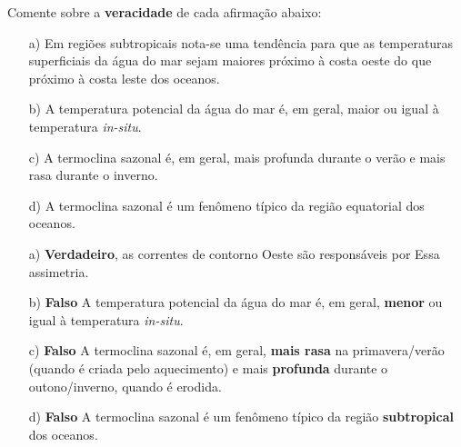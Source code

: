 \documentclass[letterpaper,portuguese,12pt,pdftex]{exam}
\begin{document}
\begin{questions}


  \question[4]
  Comente sobre a {\bf veracidade} de cada afirmação abaixo:
  \begin{itemize}
    \item[a)] Em regiões subtropicais nota-se uma tendência para que as
              temperaturas superficiais da água do mar sejam maiores próximo à
              costa oeste do que próximo à costa leste dos oceanos.
    \item[b)] A temperatura potencial da água do mar é, em geral, maior ou igual
              à temperatura {\it in-situ}.
    \item[c)] A termoclina sazonal é, em geral, mais profunda durante o verão e
              mais rasa durante o inverno.
    \item[d)] A termoclina sazonal é um fenômeno típico da região equatorial dos
              oceanos.
  \end{itemize}

  \begin{solution}
    \begin{itemize}
      \item[a)] {\bf Verdadeiro}, as correntes de contorno Oeste são responsáveis por
                Essa assimetria.
      \item[b)] {\bf Falso} A temperatura potencial da água do mar é, em geral,
                {\bf menor} ou igual à temperatura {\it in-situ}.
      \item[c)] {\bf Falso} A termoclina sazonal é, em geral, {\bf mais rasa} na
                primavera/verão (quando é criada pelo aquecimento) e mais
                {\bf profunda} durante o outono/inverno, quando é erodida.
      \item[d)] {\bf Falso} A termoclina sazonal é um fenômeno típico da região
                {\bf subtropical} dos oceanos.
    \end{itemize}

  \end{solution}

\end{questions}
\end{document}
